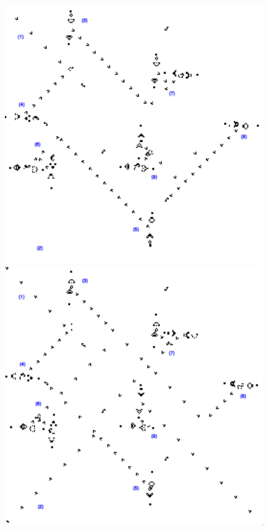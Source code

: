 \documentclass{article}
\theoremstyle{definition}
\theoremstyle{plain}
\theoremstyle{plain}
\begin{document}
\begin{figure}[H]
  \vspace{1em} %

  \begin{minipage}{0.45\textwidth}
    \centering
    \includegraphics[width=\linewidth]{figures/andNoGo2.png} %
  \end{minipage}\hfill
  \begin{minipage}{0.45\textwidth}
    \centering
    \includegraphics[width=\linewidth]{figures/andGo.png} %
  \end{minipage}


\end{figure}
\end{document}
